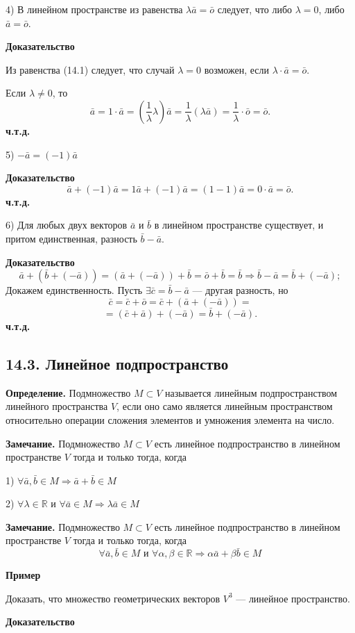 \documentclass[12pt,a4paper]{article}
\newcommand{\va}{\bar a}
\newcommand{\vb}{\bar b}
\newcommand{\vc}{\bar c}
\newcommand{\vo}{\bar o}
\begin{document}
4) В линейном пространстве из равенства $\lambda\va=\vo$ следует, что
либо $\lambda=0$, либо $\va=\vo$.

\textbf{Доказательство}

Из равенства (14.1) следует, что случай $\lambda=0$ возможен, если
$\lambda\cdot\va=\vo$.

Если $\lambda\ne0$, то
$$
\va=1\cdot\va=\left(\frac1\lambda\lambda\right)\va=\frac1\lambda(\lambda\va)=\frac1\lambda\cdot\vo=\vo.
$$
\textbf{ч.т.д.}

5) $-\va=(-1)\va$

\textbf{Доказательство}
$$
\va+(-1)\va=1\va+(-1)\va=(1-1)\va=0\cdot\va=\vo.
$$
\textbf{ч.т.д.}

6) Для любых двух векторов $\va$ и $\vb$ в линейном пространстве
существует, и притом единственная, разность $\vb-\va$.

\textbf{Доказательство}
$$
\va+(\vb+(-\va))=(\va+(-\va))+\vb=\vo+\vb=\vb\Rightarrow \vb-\va=\vb+(-\va);
$$
Докажем единственность. Пусть $\exists\vc=\vb-\va$ --- другая разность, но
$$
\vc=\vc+\vo=\vc+(\va+(-\va))=
$$
$$
=(\vc+\va)+(-\va)=\vb+(-\va).
$$
\textbf{ч.т.д.}

\subsection*{\textbf{14.3. Линейное подпространство}}

\textbf{Определение.} Подмножество $M\subset V$ называется линейным
подпространством линейного пространства $V$, если оно само является
линейным пространством относительно операции сложения элементов и
умножения элемента на число.

\textbf{Замечание.} Подмножество $M\subset V$ есть линейное
подпространство в линейном пространстве $V$ тогда и только тогда, когда

1) $\forall\va,\vb\in M\Rightarrow \va+\vb\in M$

2) $\forall\lambda\in\mathbb R$ и $\forall\va\in M\Rightarrow \lambda\va\in M$

\textbf{Замечание.} Подмножество $M\subset V$ есть линейное
подпространство в линейном пространстве $V$ тогда и только тогда, когда
$$
\forall\va,\vb\in M \text{ и } \forall\alpha,\beta\in\mathbb
R\Rightarrow \alpha\va+\beta\vb\in M
$$

\textbf{Пример}

Доказать, что множество геометрических векторов $V^3$ --- линейное пространство.

\textbf{Доказательство}
\end{document}
